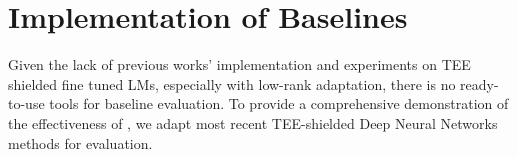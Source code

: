 

\section{Implementation of Baselines}
\label{implementation_of_baselines}
Given the lack of previous works' implementation and experiments on TEE shielded fine tuned LMs, especially with low-rank adaptation, there is no ready-to-use tools for baseline evaluation. To provide a comprehensive demonstration of the effectiveness of \method, we adapt most recent TEE-shielded Deep Neural Networks methods for evaluation. 


